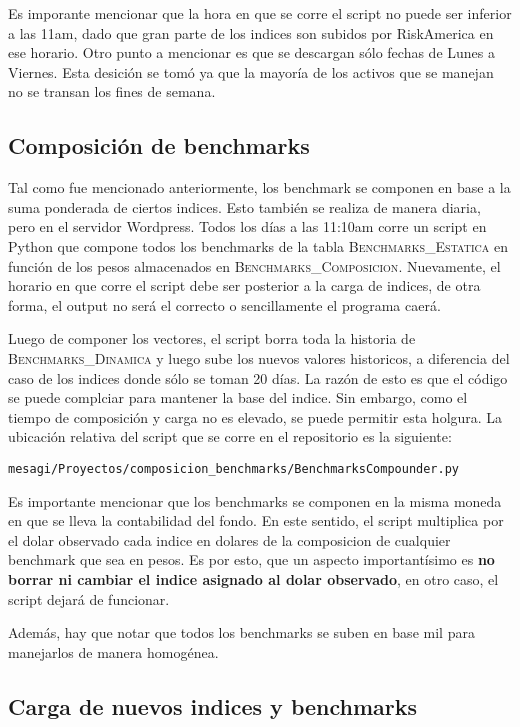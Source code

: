 \documentclass{article}
\begin{document}
Es imporante mencionar que la hora en que se corre el script no puede ser inferior a las 11am, dado que gran parte de los indices son subidos por RiskAmerica en ese horario. Otro punto a mencionar es que se descargan sólo fechas de Lunes a Viernes. Esta desición se tomó ya que la mayoría de los activos que se manejan no se transan los fines de semana.

\subsection{Composición de benchmarks}


Tal como fue mencionado anteriormente, los benchmark se componen en base a la suma ponderada de ciertos indices. Esto también se realiza de manera diaria, pero en el servidor Wordpress. Todos los días a las 11:10am corre un script en Python que compone todos los benchmarks de la tabla \textsc{Benchmarks\_Estatica} en función de los pesos almacenados en \textsc{Benchmarks\_Composicion}. Nuevamente, el horario en que corre el script debe ser posterior a la carga de indices, de otra forma, el output no será el correcto o sencillamente el programa caerá.


Luego de componer los vectores, el script borra toda la historia de \textsc{Benchmarks\_Dinamica} y luego sube los nuevos valores historicos, a diferencia del caso de los indices donde sólo se toman 20 días. La razón de esto es que el código se puede complciar para mantener la base del indice. Sin embargo, como el tiempo de composición y carga no es elevado, se puede permitir esta holgura. La ubicación relativa del script que se corre en el repositorio es la siguiente:
\begin{center}
\texttt{mesagi/Proyectos/composicion\_benchmarks/BenchmarksCompounder.py}
\end{center}


Es importante mencionar que los benchmarks se componen en la misma moneda en que se lleva la contabilidad del fondo. En este sentido, el script multiplica por el dolar observado cada indice en dolares de la composicion de cualquier benchmark que sea en pesos. Es por esto, que un aspecto importantísimo es \textbf{no borrar ni cambiar el indice asignado al dolar observado}, en otro caso, el script dejará de funcionar. 

Además, hay que notar que todos los benchmarks se suben en base mil para manejarlos de manera homogénea.

\subsection{Carga de nuevos indices y benchmarks}
\end{document}
